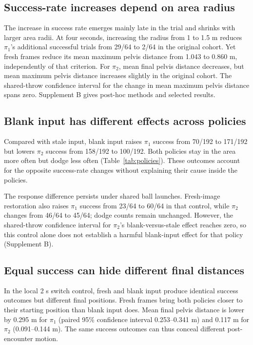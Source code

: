 \documentclass[conference]{IEEEtran}
\begin{document}
\subsection{Success-rate increases depend on area radius}
The increase in success rate emerges mainly late in the trial and shrinks with
larger area radii. At four seconds, increasing the radius from 1 to 1.5 m reduces
$\pi_1$'s additional successful trials from 29/64 to 2/64 in the original cohort.
Yet fresh frames reduce its mean maximum pelvis distance from 1.043 to 0.860 m,
independently of that criterion. For $\pi_2$, mean final pelvis distance decreases,
but mean maximum pelvis distance increases slightly in the original cohort.
The shared-throw confidence interval for the change in mean maximum pelvis
distance spans zero. Supplement B gives post-hoc methods and selected results.

\subsection{Blank input has different effects across policies}
Compared with stale input, blank input raises $\pi_1$ success from 70/192 to
171/192 but lowers $\pi_2$ success from 158/192 to 100/192. Both policies stay
in the area more often but dodge less often (Table~\ref{tab:policies}). These
outcomes account for the opposite success-rate changes without explaining
their cause inside the policies.

The response difference persists under shared ball launches. Fresh-image
restoration also raises $\pi_1$ success from 23/64 to 60/64 in that control,
while $\pi_2$ changes from 46/64 to 45/64; dodge counts remain unchanged.
However, the shared-throw confidence interval for $\pi_2$'s blank-versus-stale
effect reaches zero, so this control alone does not establish a harmful
blank-input effect for that policy (Supplement B).

\subsection{Equal success can hide different final distances}
In the local 2 s switch control, fresh and blank input produce identical
success outcomes but different final positions. Fresh frames bring both
policies closer to their starting position than blank input does. Mean final
pelvis distance is lower by 0.295 m for $\pi_1$ (paired 95\% confidence interval
0.253--0.341 m) and 0.117 m for $\pi_2$ (0.091--0.144 m).
The same success outcomes can thus conceal different post-encounter motion.
\end{document}
